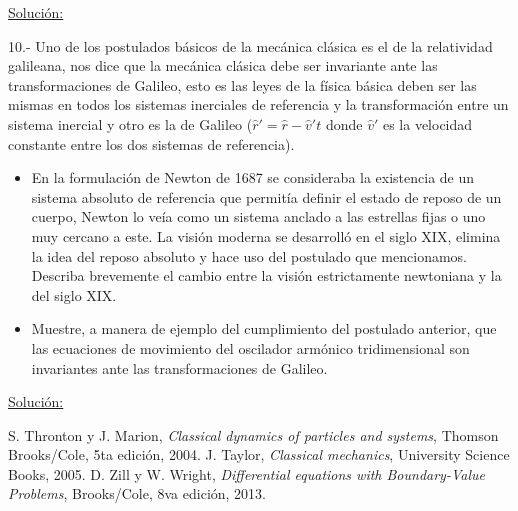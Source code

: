 \documentclass[a4paper,10pt]{article}
\begin{document}
\underline{Solución:}

\vspace{.3cm}

10.- Uno de los postulados básicos de la mecánica clásica es el de la relatividad galileana,
nos dice que la mecánica clásica debe ser invariante ante las transformaciones de Galileo, 
esto es las leyes de la física básica deben ser las mismas en todos los sistemas inerciales
de referencia y la transformación entre un sistema inercial y otro es la de Galileo 
($\hat{r}' = \hat{r} - \hat{v}'t$ donde $\hat{v}'$ es la velocidad constante entre los dos 
sistemas de referencia).

\begin{itemize}
 \item En la formulación de Newton de 1687 se consideraba la existencia de un sistema 
 absoluto de referencia que permitía definir el estado de reposo de un cuerpo, Newton lo
 veía como un sistema anclado a las estrellas fijas o uno muy cercano a este. La visión 
 moderna se desarrolló en el siglo XIX, elimina la idea del reposo absoluto y hace 
 uso del postulado que mencionamos. Describa brevemente el cambio entre la visión 
 estrictamente newtoniana y la del siglo XIX.
 \item Muestre, a manera de ejemplo del cumplimiento del postulado anterior, que las 
 ecuaciones de movimiento del oscilador armónico tridimensional son invariantes ante
 las transformaciones de Galileo.
\end{itemize}

\vspace{.3cm}

\underline{Solución:}

\vspace{.3cm}

\begin{thebibliography}{10}
 S. Thronton y J. Marion, \textit{Classical dynamics of particles and systems}, Thomson Brooks/Cole,
 5ta edición, 2004.
 J. Taylor, \textit{Classical mechanics}, University Science Books, 2005.
 D. Zill y W. Wright, \textit{Differential equations with Boundary-Value Problems}, Brooks/Cole,
 8va edición, 2013.
\end{thebibliography}
\end{document}
